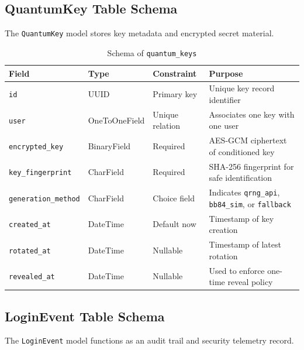 \documentclass[12pt,a4paper]{report}
\begin{document}
\subsection{QuantumKey Table Schema}
The \texttt{QuantumKey} model stores key metadata and encrypted secret material.

\begin{table}[H]
\centering
\small
\caption{Schema of \texttt{quantum\_keys}}
\label{tab:quantum-keys}
\begin{tabular}{|p{3.0cm}|p{2.8cm}|p{1.8cm}|p{6.0cm}|}
\hline
\textbf{Field} & \textbf{Type} & \textbf{Constraint} & \textbf{Purpose} \\
\hline
\texttt{id} & UUID & Primary key & Unique key record identifier \\
\hline
\texttt{user} & OneToOneField & Unique relation & Associates one key with one user \\
\hline
\texttt{encrypted\_key} & BinaryField & Required & AES-GCM ciphertext of conditioned key \\
\hline
\texttt{key\_fingerprint} & CharField & Required & SHA-256 fingerprint for safe identification \\
\hline
\texttt{generation\_method} & CharField & Choice field & Indicates \texttt{qrng\_api}, \texttt{bb84\_sim}, or \texttt{fallback} \\
\hline
\texttt{created\_at} & DateTime & Default now & Timestamp of key creation \\
\hline
\texttt{rotated\_at} & DateTime & Nullable & Timestamp of latest rotation \\
\hline
\texttt{revealed\_at} & DateTime & Nullable & Used to enforce one-time reveal policy \\
\hline
\end{tabular}
\end{table}

\subsection{LoginEvent Table Schema}
The \texttt{LoginEvent} model functions as an audit trail and security telemetry record.
\end{document}
